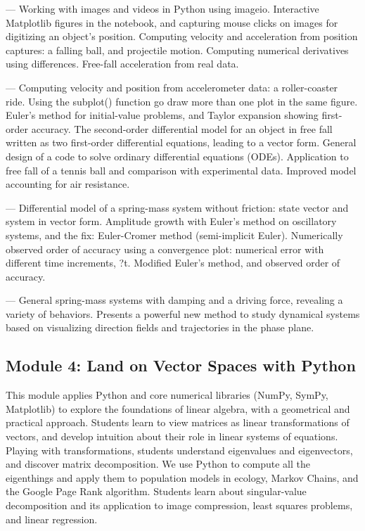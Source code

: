 \documentclass[10pt,journal,compsoc]{IEEEtran}
\begin{document}
\begin{description}[style=unboxed]

\item[Lesson 1: Catch things in motion]---
Working with images and videos in Python using imageio. Interactive Matplotlib figures in the notebook, and capturing mouse clicks on images for digitizing an object's position. Computing velocity and acceleration from position captures: a falling ball, and projectile motion. Computing numerical derivatives using differences. Free-fall acceleration from real data.

\item[Lesson 2: Step to the future]---
Computing velocity and position from accelerometer data: a roller-coaster ride. Using the subplot() function go draw more than one plot in the same figure. Euler's method for initial-value problems, and Taylor expansion showing first-order accuracy. The second-order differential model for an object in free fall written as two first-order differential equations, leading to a vector form. General design of a code to solve ordinary differential equations (ODEs). Application to free fall of a tennis ball and comparison with experimental data. Improved model accounting for air resistance.

\item[Lesson 3: Get with the oscillations]---
Differential model of a spring-mass system without friction: state vector and system in vector form. Amplitude growth with Euler's method on oscillatory systems, and the fix: Euler-Cromer method (semi-implicit Euler). Numerically observed order of accuracy using a convergence plot: numerical error with different time increments, ?t. Modified Euler's method, and observed order of accuracy.

\item[Lesson 4: Bird's-eye view of mechanical vibrations]---
General spring-mass systems with damping and a driving force, revealing a variety of behaviors. Presents a powerful new method to study dynamical systems based on visualizing direction fields and trajectories in the phase plane.

\end{description}

\subsection{Module 4: Land on Vector Spaces with Python}
This module applies Python and core numerical libraries (NumPy, SymPy, Matplotlib) to explore the foundations of linear algebra, with a geometrical and practical approach. 
Students learn to view matrices as linear transformations of vectors, and develop intuition about their role in linear systems of equations. 
Playing with transformations, students understand eigenvalues and eigenvectors, and discover matrix decomposition. 
We use Python to compute all the eigenthings and apply them to population models in ecology, Markov Chains, and the Google Page Rank algorithm. 
Students learn about singular-value decomposition and its application to image compression, least squares problems, and linear regression.
\end{document}
